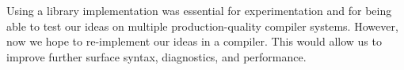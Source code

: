 
Using a library implementation was essential for experimentation and for being able to
test our ideas on multiple production-quality compiler systems.
However, now we hope to re-implement our ideas in a compiler.
This would allow us to improve further surface syntax, diagnostics, and performance.

%
%
%
%
%